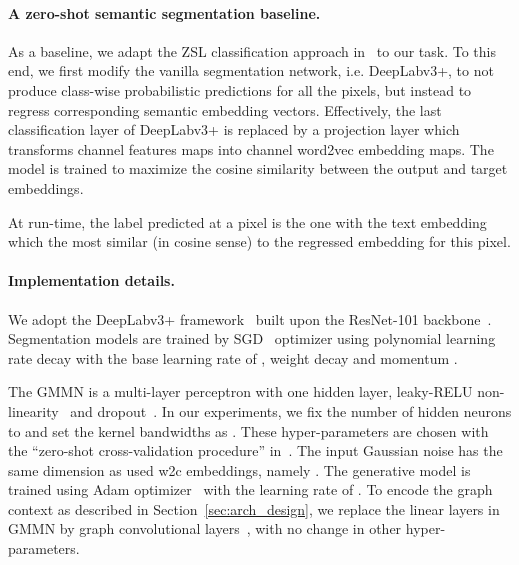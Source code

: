 \documentclass{article}
\begin{document}
\vspace{-0.3cm}
\paragraph{A zero-shot semantic segmentation baseline.}

As a baseline, we adapt the ZSL classification approach in~\cite{frome2013devise} to our task.
To this end, we first modify the vanilla segmentation network, i.e. DeepLabv3+, to not produce class-wise probabilistic predictions for all the pixels, but instead to regress corresponding semantic embedding vectors.
Effectively, the last classification layer of DeepLabv3+ is replaced by a projection layer which transforms channel features maps into channel word2vec embedding maps.
The model is trained to maximize the cosine similarity between the output and target embeddings. 

At run-time, the label predicted at a pixel is the one with the text embedding which the most similar (in cosine sense) to the regressed embedding for this pixel.


\vspace{-0.3cm}
\paragraph{Implementation details.}
We adopt the DeepLabv3+ framework~\cite{chen2018encoder} built upon the ResNet-101 backbone~\cite{he2016deep}.
Segmentation models are trained by SGD~\cite{bottou2010large} optimizer using polynomial learning rate decay with the base learning rate of , weight decay  and momentum .

The GMMN is a multi-layer perceptron with one hidden layer, leaky-RELU non-linearity~\cite{maas2013rectifier} and dropout~\cite{srivastava2014dropout}.
In our experiments, we fix the number of hidden neurons to  and set the kernel bandwidths as .
These hyper-parameters are chosen with the ``zero-shot cross-validation procedure'' in~\cite{bucher2017generating}.
The input Gaussian noise has the same dimension as used w2c embeddings, namely .
The generative model is trained using Adam optimizer~\cite{kingma2014adam} with the learning rate of .
To encode the graph context as described in Section~\ref{sec:arch_design}, we replace the linear layers in GMMN by graph convolutional layers~\cite{kipf2016semi}, with no change in other hyper-parameters.
\end{document}
